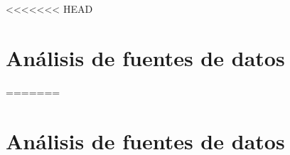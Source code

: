 <<<<<<< HEAD
\section{Análisis de fuentes de datos}
\label{sec:sustdata}



\cite{sustdata}








=======
\section{Análisis de fuentes de datos}
\label{sec:sustdata}

